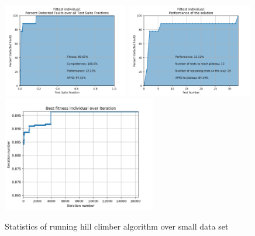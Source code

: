 \documentclass[12pt]{article}
\begin{document}
\begin{figure}[H]
  \centering
  \includegraphics[width=0.49\textwidth]{hill_climber_small_apfd_total}
  \includegraphics[width=0.49\textwidth]{hill_climber_small_apfd_local}
  \includegraphics[width=0.6\textwidth]{hill_climber_small_fitness_all}
  \caption{Statistics of running hill climber algorithm over small data set}
  \label{fig:hill_climber_small}
\end{figure}
\end{document}

